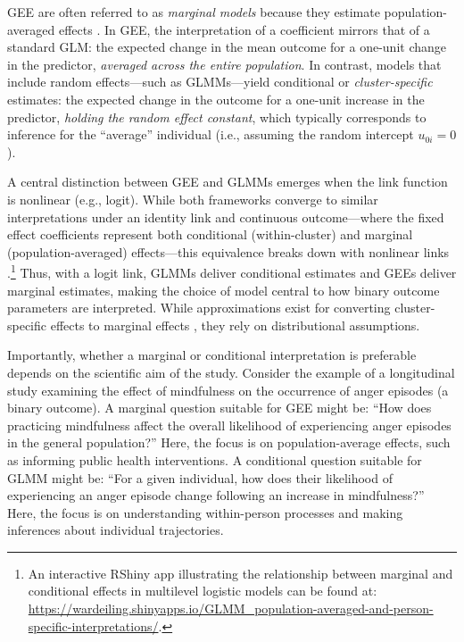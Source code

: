 GEE are often referred to as \textit{marginal models} because they estimate population-averaged effects \parencite{diggle_analysis_2002}. In GEE, the interpretation of a coefficient mirrors that of a standard GLM: the expected change in the mean outcome for a one-unit change in the predictor, \textit{averaged across the entire population}. In contrast, models that include random effects—such as GLMMs—yield conditional or \textit{cluster-specific} estimates: the expected change in the outcome for a one-unit increase in the predictor, \textit{holding the random effect constant}, which typically corresponds to inference for the “average” individual (i.e., assuming the random intercept \( u_{0i} = 0 \)).

A central distinction between GEE and GLMMs emerges when the link function is nonlinear (e.g., logit). While both frameworks converge to similar interpretations under an identity link and continuous outcome—where the fixed effect coefficients represent both conditional (within-cluster) and marginal (population-averaged) effects—this equivalence breaks down with nonlinear links \parencite[]{neuhaus_comparison_1991}.\footnote{An interactive RShiny app illustrating the relationship between marginal and conditional effects in multilevel logistic models can be found at: \href{https://wardeiling.shinyapps.io/GLMM_population-averaged-and-person-specific-interpretations/}{https://wardeiling.shinyapps.io/GLMM\_population-averaged-and-person-specific-interpretations/}.} Thus, with a logit link, GLMMs deliver conditional estimates and GEEs deliver marginal estimates, making the choice of model central to how binary outcome parameters are interpreted. While approximations exist for converting cluster-specific effects to marginal effects \parencite[cf.][]{austin_intermediate_2017}, they rely on distributional assumptions.

Importantly, whether a marginal or conditional interpretation is preferable depends on the scientific aim of the study. Consider the example of a longitudinal study examining the effect of mindfulness on the occurrence of anger episodes (a binary outcome). A marginal question suitable for GEE might be: ``How does practicing mindfulness affect the overall likelihood of experiencing anger episodes in the general population?'' Here, the focus is on population-average effects, such as informing public health interventions. A conditional question suitable for GLMM might be: ``For a given individual, how does their likelihood of experiencing an anger episode change following an increase in mindfulness?'' Here, the focus is on understanding within-person processes and making inferences about individual trajectories.


